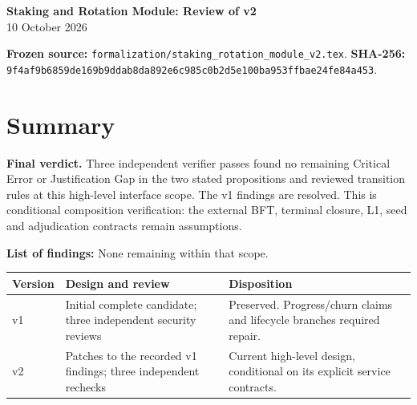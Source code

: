 \documentclass[11pt,a4paper]{article}
\begin{document}
\begin{center}
{\Large\bfseries Staking and Rotation Module: Review of v2}\\[4pt]
10 October 2026
\end{center}
\textbf{Frozen source:} \texttt{formalization/staking\_rotation\_module\_v2.tex}.
\textbf{SHA-256:}\\
\texttt{9f4af9b6859de169b9ddab8da892e6c985c0b2d5e100ba953ffbae24fe84a453}.

\section*{Summary}
\textbf{Final verdict.} Three independent verifier passes found no remaining
Critical Error or Justification Gap in the two stated propositions and
reviewed transition rules at this high-level interface scope. The v1
findings are resolved. This is conditional composition verification:
the external BFT, terminal closure, L1, seed and adjudication contracts
remain assumptions.

\textbf{List of findings:} None remaining within that scope.

\begin{tabularx}{\linewidth}{@{}lXX@{}}
\toprule
Version & Design and review & Disposition\\\midrule
v1 & Initial complete candidate; three independent security reviews &
Preserved. Progress/churn claims and lifecycle branches required repair.\\
v2 & Patches to the recorded v1 findings; three independent rechecks &
Current high-level design, conditional on its explicit service contracts.\\
\bottomrule
\end{tabularx}
\end{document}
